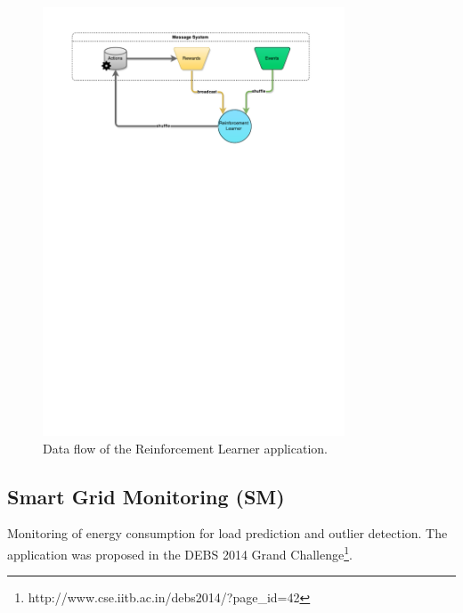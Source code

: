 \documentclass[ppgc,diss,english]{iiufrgs}
\begin{document}
\begin{figure}[!ht]
	\centering
	\includegraphics[width=0.8\textwidth]{images/apps/ReinforcementLearner.pdf}
	\caption{Data flow of the Reinforcement Learner application.}
	\label{fig:app_reinforcement_learner}
\end{figure}

\subsection{Smart Grid Monitoring (SM)}

Monitoring of energy consumption for load prediction and outlier detection. The application was proposed in the DEBS 2014 Grand Challenge\footnote{http://www.cse.iitb.ac.in/debs2014/?page\_id=42}.
\end{document}

